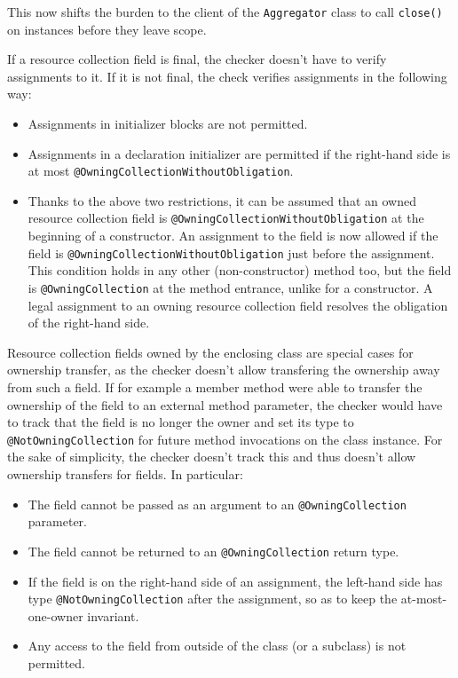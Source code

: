 This now shifts the burden to the client of the \texttt{Aggregator} class to call \texttt{close()} on instances before they leave scope.

If a resource collection field is final, the checker doesn't have to verify assignments to it. If it is not final, the check verifies assignments in the following way:
\begin{itemize}
  \item Assignments in initializer blocks are not permitted.
  \item Assignments in a declaration initializer are permitted if the right-hand side is at most \texttt{@OwningCollectionWithoutObligation}.
  \item Thanks to the above two restrictions, it can be assumed that an owned resource collection field is \texttt{@OwningCollectionWithoutObligation} at the beginning of a constructor. An assignment to the field is now allowed if the field is \texttt{@OwningCollectionWithoutObligation} just before the assignment. This condition holds in any other (non-constructor) method too, but the field is \texttt{@OwningCollection} at the method entrance, unlike for a constructor. A legal assignment to an owning resource collection field resolves the obligation of the right-hand side.
\end{itemize}

Resource collection fields owned by the enclosing class are special cases for ownership transfer, as the checker doesn't allow transfering the ownership away from such a field. If for example a member method were able to transfer the ownership of the field to an external method parameter, the checker would have to track that the field is no longer the owner and set its type to \texttt{@NotOwningCollection} for future method invocations on the class instance. For the sake of simplicity, the checker doesn't track this and thus doesn't allow ownership transfers for fields. In particular:

\begin{itemize}
  \item The field cannot be passed as an argument to an \texttt{@OwningCollection} parameter.
  \item The field cannot be returned to an \texttt{@OwningCollection} return type.
  \item If the field is on the right-hand side of an assignment, the left-hand side has type \texttt{@NotOwningCollection} after the assignment, so as to keep the at-most-one-owner invariant.
  \item Any access to the field from outside of the class (or a subclass) is not permitted.
\end{itemize}

